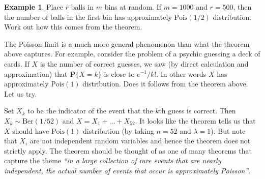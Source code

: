 \documentclass[preprint,  11pt]{amsart}
\theoremstyle{plain} %
\theoremstyle{definition} %
\newtheorem{example}[theorem]{Example}
\begin{document}
\begin{example} Place $r$ balls in $m$ bins at random. If $m=1000$  and $r=500$, then the number of balls in the first bin has approximately $\mbox{Pois}(1/2)$ distribution. Work out how this comes from the theorem.
\end{example}

The Poisson limit is a much more general phenomenon than what the theorem above captures. For example, consider the problem of a psychic guessing a deck of cards. If $X$ is the number  of correct guesses, we saw (by direct calculation and approximation) that $\mathbf{P}\{X=k\}$ is close to $e^{-1}/k!$. In other words $X$ has approximately $\mbox{Pois}(1)$ distribution. Does it follows from the theorem above. Let us try.

Set $X_{k}$ to be the indicator of the event that the $k$th guess is correct. Then $X_{k}\sim \mbox{Ber}(1/52)$ and $X=X_{1}+\ldots +X_{52}$. It looks like the theorem tells us that $X$ should have $\mbox{Pois}(1)$ distribution (by taking $n=52$ and $\lambda=1$). But note that $X_{i}$ are not independent random variables and hence the theorem does not strictly apply. The theorem should be thought of as one of many theorems that capture the theme {\em ``in a large collection of rare events that are nearly independent, the actual number of events that occur is approximately Poisson''}.
\end{document}
